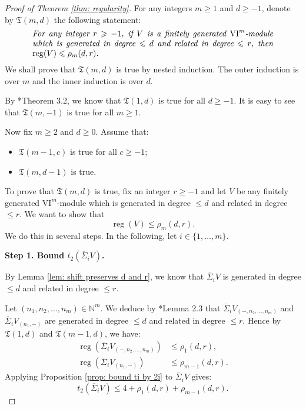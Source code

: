 \documentclass{amsart}
\numberwithin{equation}{section}
\DeclareMathOperator{\reg}{reg}
\newcommand{\N}{{\mathbb{N}}}
\newcommand{\VI}{{\mathrm{VI}}}
\newcommand{\SSigma}{{\overline{\Sigma}}}
\begin{document}
\begin{proof}[Proof of Theorem \ref{thm: regularity}]
   For any integers $m\geqslant 1$ and $d\geqslant -1$, denote by $\mathfrak{T}(m, d)$ the following statement:
   \begin{equation*}
      \parbox{.85\textwidth}{\it For any integer $r\geqslant -1$, if $V$ is a finitely generated $\VI^m$-module which is generated in degree $\leqslant d$ and related in degree $\leqslant r$, then $\reg(V)\leqslant \rho_m(d,r)$.}
   \end{equation*}
   We shall prove that $\mathfrak{T}(m,d)$ is true by nested induction. The outer induction is over $m$ and the inner induction is over $d$. 

   By \cite{gl_vi}*{Theorem 3.2}, we know that $\mathfrak{T}(1,d)$ is true for all $d\geqslant -1$. It is easy to see that $\mathfrak{T}(m,-1)$ is true for all $m\geqslant 1$. 

   Now fix $m\geqslant 2$ and $d\geqslant 0$. Assume that:
   \begin{itemize}
      \item $\mathfrak{T}(m-1, c)$ is true for all $c\geqslant -1$;
      \item $\mathfrak{T}(m, d-1)$ is true.
   \end{itemize}
   To prove that $\mathfrak{T}(m,d)$ is true, fix an integer $r\geqslant -1$ and let $V$ be any finitely generated $\VI^m$-module which is generated in degree $\leqslant d$ and related in degree $\leqslant r$. We want to show that 
   \[ \reg(V) \leqslant \rho_m(d,r). \] 
   We do this in several steps. In the following, let $i\in \{1, \ldots, m\}$.
 
   \bigskip 
   
   {\bf Step 1. Bound $t_2(\SSigma_i V)$.}
   
   \medskip 

   By Lemma \ref{lem: shift preserves d and r}, we know that $\SSigma_i V$ is generated in degree $\leqslant d$ and related in degree $\leqslant r$. 

   Let $(n_1, n_2, \ldots, n_m)\in \N^m$. We deduce by \cite{gta}*{Lemma 2.3} that $\SSigma_i V_{(-, n_2, \ldots, n_m)}$ and $\SSigma_i V_{(n_1, -)}$ are generated in degree $\leqslant d$ and related in degree $\leqslant r$. Hence by $\mathfrak{T}(1,d)$ and $\mathfrak{T}(m-1,d)$, we have: 
   \begin{align*}
      \reg\left( \SSigma_i V_{(-,n_2,\ldots, n_m)} \right) &\leqslant \rho_1 (d,r),\\
      \reg\left( \SSigma_i V_{(n_1,-)}\right) &\leqslant \rho_{m-1} (d,r).
   \end{align*}
   Applying Proposition \ref{prop: bound ti by 2i} to $\SSigma_i V$ gives:
   \begin{equation} \label{eq:t2bound}
      t_2(\SSigma_i V) \leqslant 4 + \rho_1(d,r) + \rho_{m-1}(d,r).
   \end{equation}



\end{proof}
\end{document}

